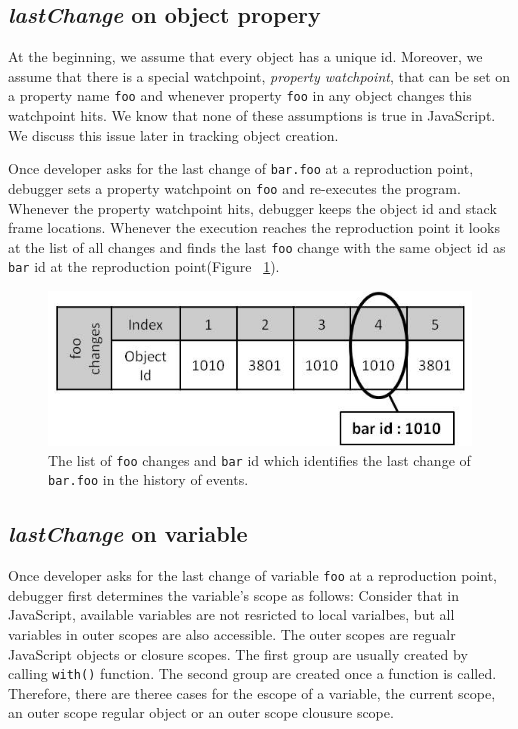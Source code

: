\documentclass[preprint]{sigplanconf}
\begin{document}
\subsection{\textit{lastChange} on object propery}

At the beginning, we assume that every object has a unique id. Moreover, we assume that there is a special watchpoint, \textit{property watchpoint}, that can be set on a property name \texttt{foo} and whenever property \texttt{foo} in any object changes this watchpoint hits. We know that none of these assumptions is true in JavaScript. We discuss this issue later in tracking object creation. 

Once developer asks for the last change of \texttt{bar.foo} at a reproduction point, debugger sets a property watchpoint on \texttt{foo} and  re-executes the program. Whenever the property watchpoint hits, debugger keeps the object id and stack frame locations. Whenever the execution reaches the reproduction point it looks at the list of all changes and finds the last \texttt{foo} change with the same object id as \texttt{bar} id at the reproduction point(Figure ~\ref{fig:foo-changes1}). 

\begin{figure}[htp]
\includegraphics[width=.48\textwidth]{6-foo-changes1.jpg}
\caption{The list of \texttt{foo} changes and \texttt{bar} id which identifies the last change of \texttt{bar.foo} in the history of events.}
\label{fig:foo-changes1}
\end{figure}



\subsection{\textit{lastChange} on variable} 
Once developer asks for the last change of variable \texttt{foo} at a reproduction point, debugger first determines the variable's scope as follows:  Consider that in JavaScript, available variables are not resricted to local varialbes, but all variables in outer scopes are also accessible. The outer scopes are regualr JavaScript objects or closure scopes. The first group are usually created by calling \texttt{with()} function. The second group are created once a function is called. Therefore, there are theree cases for the escope of a variable, the current scope, an outer scope regular object or an outer scope clousure scope. 
\end{document}

